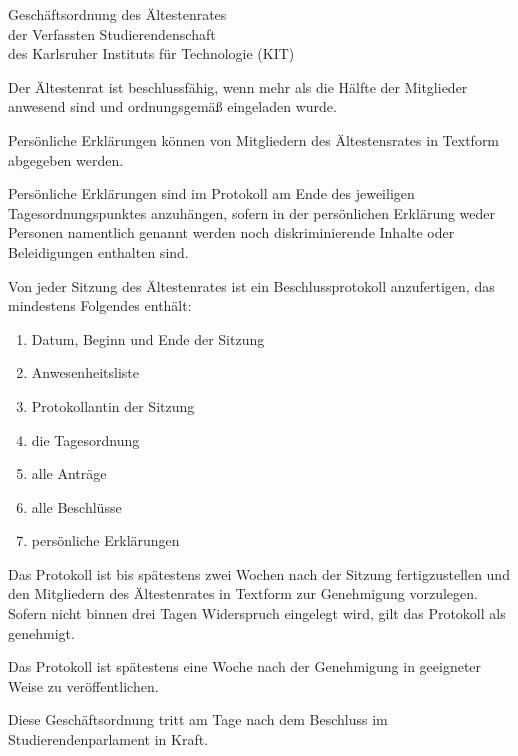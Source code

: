 \begin{jurdoc}{Geschäftsordnung des Ältestenrates\\der Verfassten Studierendenschaft\\des Karlsruher Instituts für Technologie (KIT)}
\label{aera-go:beschlussfaehigkeit}

Der Ältestenrat ist beschlussfähig, wenn mehr als die Hälfte der Mitglieder anwesend sind und ordnungsgemäß eingeladen wurde.


\label{aera-go:pers_erklaerungen}

Persönliche Erklärungen können von Mitgliedern des Ältestensrates in Textform abgegeben werden.

Persönliche Erklärungen sind im Protokoll am Ende des jeweiligen Tagesordnungspunktes anzuhängen, sofern in der persönlichen Erklärung weder Personen namentlich genannt werden noch diskriminierende Inhalte oder Beleidigungen enthalten sind.


\label{aera-go:protokoll}

Von jeder Sitzung des Ältestenrates ist ein Beschlussprotokoll anzufertigen, das mindestens Folgendes enthält:
\begin{enumerate}
	\item Datum, Beginn und Ende der Sitzung
	\item Anwesenheitsliste
	\item Protokollantin der Sitzung
	\item die Tagesordnung
	\item alle Anträge
	\item alle Beschlüsse
	\item persönliche Erklärungen
\end{enumerate}

Das Protokoll ist bis spätestens zwei Wochen nach der Sitzung fertigzustellen und den Mitgliedern des Ältestenrates in Textform zur Genehmigung vorzulegen. Sofern nicht binnen drei Tagen Widerspruch eingelegt wird, gilt das Protokoll als genehmigt.

Das Protokoll ist spätestens eine Woche nach der Genehmigung in geeigneter Weise zu veröffentlichen.


\label{aera-go:inkrafttreten}

Diese Geschäftsordnung tritt am Tage nach dem Beschluss im Studierendenparlament in Kraft.



\end{jurdoc}
